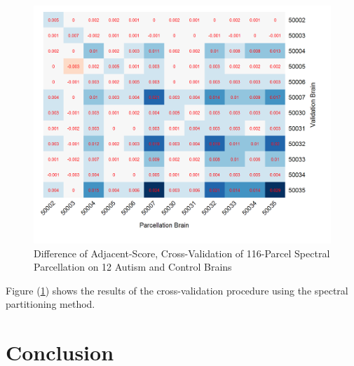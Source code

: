 \begin{figure}
\caption{Difference of Adjacent-Score, Cross-Validation of
116-Parcel Spectral Parcellation on 12 Autism and Control Brains}
\label{cv_sp}
\includegraphics[scale = 1]{figs/8_cv_sp.png}
\end{figure}

Figure (\ref{cv_sp}) shows the results of the cross-validation procedure
using the spectral partitioning method.

\section{Conclusion}

